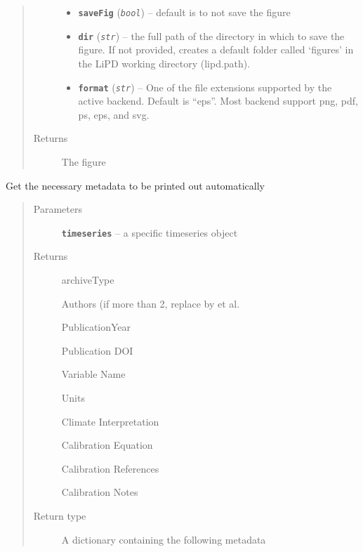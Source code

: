 \documentclass[letterpaper,10pt,english]{sphinxmanual}
\begin{document}
\begin{fulllineitems}
\begin{fulllineitems}
\begin{quote}
\begin{description}
\begin{itemize}
\item {} 
\textbf{\texttt{saveFig}} (\emph{\texttt{bool}}) -- default is to not save the figure

\item {} 
\textbf{\texttt{dir}} (\emph{\texttt{str}}) -- the full path of the directory in which to save the figure.
If not provided, creates a default folder called `figures' in the
LiPD working directory (lipd.path).

\item {} 
\textbf{\texttt{format}} (\emph{\texttt{str}}) -- One of the file extensions supported by the active
backend. Default is ``eps''. Most backend support png, pdf, ps, eps,
and svg.

\end{itemize}

\item[{Returns}] \leavevmode
The figure

\end{description}\end{quote}

\end{fulllineitems}


\begin{fulllineitems}
\label{SummaryPlots:pyleoclim.SummaryPlots.getMetadata}
Get the necessary metadata to be printed out automatically
\begin{quote}\begin{description}
\item[{Parameters}] \leavevmode
\textbf{\texttt{timeseries}} -- a specific timeseries object

\item[{Returns}] \leavevmode

archiveType

Authors (if more than 2, replace by et al.

PublicationYear

Publication DOI

Variable Name

Units

Climate Interpretation

Calibration Equation

Calibration References

Calibration Notes


\item[{Return type}] \leavevmode
A dictionary containing the following metadata

\end{description}\end{quote}

\end{fulllineitems}


\end{fulllineitems}
\end{document}
